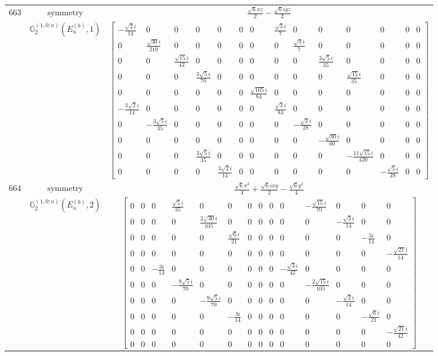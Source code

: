 \documentclass[fleqn,8pt,landscape]{jsarticle}
\begin{document}
\begin{longtable}{ccc}
$ 663 $ & $ \text{symmetry} $ & $ \frac{\sqrt{6} x z}{2} - \frac{\sqrt{6} i y z}{2} $ \\
$  $ & $ \mathbb{G}_{2}^{(1,0;a)}(E_{u}^{(b)},1) $ & $ \begin{bmatrix} - \frac{\sqrt{2} i}{14} & 0 & 0 & 0 & 0 & 0 & 0 & \frac{\sqrt{3} i}{7} & 0 & 0 & 0 & 0 & 0 & 0 \\ 0 & \frac{\sqrt{30} i}{210} & 0 & 0 & 0 & 0 & 0 & 0 & \frac{\sqrt{3} i}{7} & 0 & 0 & 0 & 0 & 0 \\ 0 & 0 & \frac{\sqrt{15} i}{42} & 0 & 0 & 0 & 0 & 0 & 0 & \frac{3 \sqrt{5} i}{35} & 0 & 0 & 0 & 0 \\ 0 & 0 & 0 & \frac{3 \sqrt{5} i}{70} & 0 & 0 & 0 & 0 & 0 & 0 & \frac{\sqrt{15} i}{35} & 0 & 0 & 0 \\ 0 & 0 & 0 & 0 & 0 & 0 & \frac{\sqrt{105} i}{84} & 0 & 0 & 0 & 0 & 0 & 0 & 0 \\ - \frac{3 \sqrt{2} i}{14} & 0 & 0 & 0 & 0 & 0 & 0 & \frac{\sqrt{3} i}{84} & 0 & 0 & 0 & 0 & 0 & 0 \\ 0 & - \frac{3 \sqrt{5} i}{35} & 0 & 0 & 0 & 0 & 0 & 0 & - \frac{\sqrt{2} i}{28} & 0 & 0 & 0 & 0 & 0 \\ 0 & 0 & 0 & 0 & 0 & 0 & 0 & 0 & 0 & - \frac{\sqrt{30} i}{60} & 0 & 0 & 0 & 0 \\ 0 & 0 & 0 & \frac{3 \sqrt{5} i}{35} & 0 & 0 & 0 & 0 & 0 & 0 & - \frac{11 \sqrt{15} i}{420} & 0 & 0 & 0 \\ 0 & 0 & 0 & 0 & \frac{3 \sqrt{2} i}{14} & 0 & 0 & 0 & 0 & 0 & 0 & - \frac{\sqrt{5} i}{28} & 0 & 0 \end{bmatrix} $ \\ \hline
$ 664 $ & $ \text{symmetry} $ & $ \frac{\sqrt{6} x^{2}}{4} + \frac{\sqrt{6} i x y}{2} - \frac{\sqrt{6} y^{2}}{4} $ \\
$  $ & $ \mathbb{G}_{2}^{(1,0;a)}(E_{u}^{(b)},2) $ & $ \begin{bmatrix} 0 & 0 & 0 & \frac{\sqrt{5} i}{35} & 0 & 0 & 0 & 0 & 0 & 0 & - \frac{\sqrt{15} i}{70} & 0 & 0 & 0 \\ 0 & 0 & 0 & 0 & \frac{2 \sqrt{30} i}{105} & 0 & 0 & 0 & 0 & 0 & 0 & - \frac{\sqrt{3} i}{14} & 0 & 0 \\ 0 & 0 & 0 & 0 & 0 & \frac{\sqrt{6} i}{21} & 0 & 0 & 0 & 0 & 0 & 0 & - \frac{3 i}{14} & 0 \\ 0 & 0 & 0 & 0 & 0 & 0 & 0 & 0 & 0 & 0 & 0 & 0 & 0 & - \frac{\sqrt{21} i}{14} \\ 0 & 0 & - \frac{3 i}{14} & 0 & 0 & 0 & 0 & 0 & 0 & - \frac{\sqrt{3} i}{42} & 0 & 0 & 0 & 0 \\ 0 & 0 & 0 & - \frac{9 \sqrt{5} i}{70} & 0 & 0 & 0 & 0 & 0 & 0 & - \frac{2 \sqrt{15} i}{105} & 0 & 0 & 0 \\ 0 & 0 & 0 & 0 & - \frac{9 \sqrt{5} i}{70} & 0 & 0 & 0 & 0 & 0 & 0 & - \frac{\sqrt{2} i}{14} & 0 & 0 \\ 0 & 0 & 0 & 0 & 0 & - \frac{3 i}{14} & 0 & 0 & 0 & 0 & 0 & 0 & - \frac{\sqrt{6} i}{21} & 0 \\ 0 & 0 & 0 & 0 & 0 & 0 & 0 & 0 & 0 & 0 & 0 & 0 & 0 & - \frac{\sqrt{21} i}{42} \\ 0 & 0 & 0 & 0 & 0 & 0 & 0 & 0 & 0 & 0 & 0 & 0 & 0 & 0 \end{bmatrix} $ \\ \hline

\end{longtable}
\end{document}
